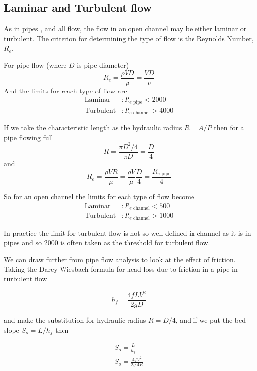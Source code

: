 \documentclass[a4paper, 12pt, british]{article} %
\numberwithin{equation}{section}
\numberwithin{figure}{section}
\numberwithin{table}{section}
\begin{document}
\subsection{Laminar and Turbulent flow}

As in pipes , and all flow, the flow in an open channel may be either laminar or turbulent. The criterion for determining the type of flow is the Reynolds Number, $R_e$.

For pipe flow (where $D$ is pipe diameter)
\begin{equation}
R_e = \frac{\rho V D}{\mu} = \frac{VD}{\nu}
\label{eq:re}
\end{equation} 
And the limits for reach type of flow are
\begin{align*}
\text{Laminar}&:  R_{e \text{ pipe}} < 2000 \\
\text{Turbulent}&:  R_{e \text{ channel}} > 4000
\end{align*}

If we take the characteristic length as the hydraulic radius $R = A/P$ then for a pipe \underline{flowing full} 
\begin{equation*}
R = \frac{\pi D^2/4}{\pi D}=\frac{D}{4} 
\end{equation*}
and
\begin{equation}
R_e = \frac{\rho V R}{\mu}=\frac{\rho V}{\mu}\frac{D}{4} = \frac{R_{e  \text{ pipe}}}{4} 
\end{equation}


So for an open channel the limits for each type of flow become
\begin{align*}
\text{Laminar}&:  R_{e \text{ channel}} < 500 \\
\text{Turbulent}&:  R_{e \text{ channel}} > 1000
\end{align*}


In practice the limit for turbulent flow is not so well defined in channel as it is in pipes and so 2000 is often taken as the threshold for turbulent flow.

We can draw further from pipe flow analysis to look at the effect of friction. Taking the Darcy-Wiesbach formula for head loss due to friction in a pipe in turbulent flow 

\begin{equation}
h_f = \frac{4fLV^2}{2gD}
\end{equation}

and make the substitution for hydraulic radius $R = D/4 $,
and if we put the bed slope $S_o = L/h_f$ then

\begin{align}
 S_o = \frac{L}{h_f} \nonumber \\
 S_o = \frac{4fV^2}{2g \; 4R}
\end{align}
 
\end{document}
